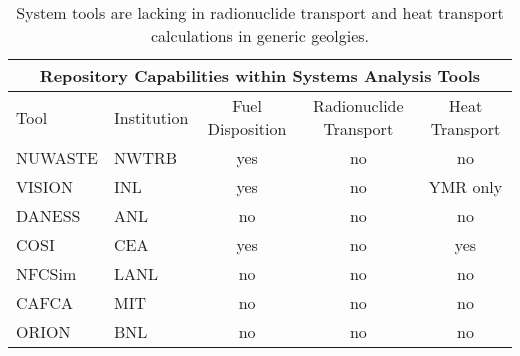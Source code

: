 %
\begin{table}
  \centering
  \footnotesize{
  \begin{tabular}{|l|l|c|c|c|}
    \multicolumn{5}{c}{\textbf{Repository Capabilities within Systems Analysis Tools}}\\
    \hline
    Tool & Institution & Fuel Disposition & Radionuclide Transport & Heat Transport  \\
    \hline
    NUWASTE\cite{abkowitz_nuclear_2010} & NWTRB & yes & no & no \\
    VISION \cite{yacout_vision_2006} & INL   & yes & no & YMR only \\
    DANESS \cite{van_den_durpel_daness:_2006} & ANL   & no & no & no \\
    COSI   \cite{boucher_international_2010} & CEA   & yes & no & yes \\
    NFCSim \cite{schneider_nfcsim_2004} & LANL  & no & no & no \\
    CAFCA  \cite{guerin_benchmark_2009} & MIT   & no & no & no \\
    ORION  \cite{guerin_benchmark_2009} & BNL   & no & no & no \\
    \hline
  \end{tabular}
  \caption[System Tools]{System tools are lacking in radionuclide transport and  
  heat transport calculations in generic geolgies.}
  \label{tab:systools}
  }
\end{table}


